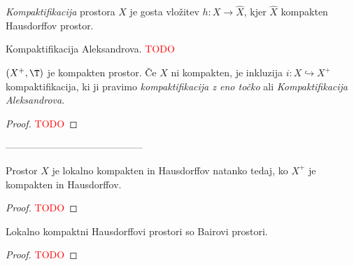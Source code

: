 \begin{definicija}
    \emph{Kompaktifikacija} prostora $X$ je gosta vložitev $h: X \to \widehat{X}$, kjer \(\widehat{X}\) kompakten Hausdorffov prostor.
\end{definicija}

Kompaktifikacija Aleksandrova. \textcolor{red}{TODO}

\begin{izrek}
    $(X^+, \T)$ je kompakten prostor. Če $X$ ni kompakten, je inkluzija $i: X \hookrightarrow X^+$ kompaktifikacija, ki ji pravimo \emph{kompaktifikacija z eno točko} ali \emph{Kompaktifikacija Aleksandrova}.
\end{izrek}

\begin{proof}
    \textcolor{red}{TODO}
\end{proof}



------------------------------------------
\begin{trditev}
    Prostor $X$ je lokalno kompakten in Hausdorffov natanko tedaj, ko $X^+$ je kompakten in Hausdorffov.
\end{trditev}

\begin{proof}
    \textcolor{red}{TODO}
\end{proof}




\begin{opomba}
    Lokalno kompaktni Hausdorffovi prostori so Bairovi prostori.
\end{opomba}

\begin{proof}
    \textcolor{red}{TODO}
\end{proof}

